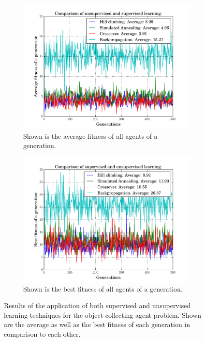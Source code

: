 \documentclass[10pt,a4paper,DIV=11]{scrreprt}
\begin{document}
\begin{figure}[H]
\centering
\begin{subfigure}{\textwidth}
  \centering
  \includegraphics[width=0.8\linewidth]{files/unsupervised/all_average.pdf}
  \caption{Shown is the average fitness of all agents of a generation.}
  \label{fig:aa}
\end{subfigure}%
\newline
\begin{subfigure}{\textwidth}
  \centering
  \includegraphics[width=0.8\linewidth]{files/unsupervised/all_best.pdf}
  \caption{Shown is the best fitness of all agents of a generation.}
  \label{fig:ab}
\end{subfigure}
\newline
\caption{Results of the application of both supervised and unsupervised learning techniques for the object collecting agent problem.
         Shown are the average as well as the best fitness of each generation in comparison to each other.}
\label{fig:a}
\end{figure}
\end{document}
